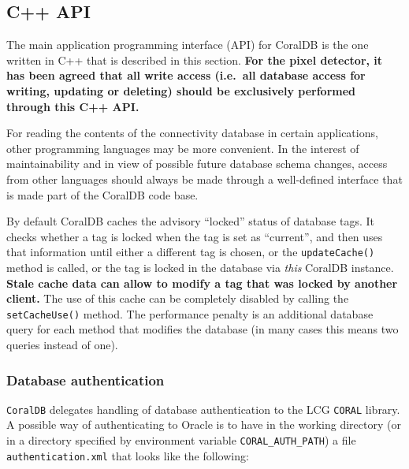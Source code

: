 
\begingroup
\newcommand{\code}[1]{\texttt{#1}}
\newcommand{\args}[1]{\textsl{#1}}


\subsection{C++ API}


The main application programming interface (API) for CoralDB is the one written in C++ that is described in this section.
{\bf For the pixel detector, it has been agreed that all write access (i.e.\ all
database access for writing, updating or deleting)
should be exclusively performed through this C++ API. }

For reading the contents of the
connectivity database in certain applications, other programming languages may be more convenient.
In the interest of maintainability and in view of possible future database schema changes, access from
other languages should always be made through a well-defined interface that is made part of the CoralDB
code base.

By default CoralDB caches the advisory ``locked'' status of database
tags.  It checks whether a tag is locked when the tag is set as
``current'', and then uses that information until either a different
tag is chosen, or the \code{updateCache()} method is called, or the
tag is locked in the database via \emph{this} CoralDB instance.
\textbf{Stale cache data can allow to modify a tag that was locked by
  another client.}  The use of this cache can be completely disabled by
calling the \code{setCacheUse()} method.  The performance penalty is
an additional database query for each method that modifies the
database (in many cases this means two queries instead of one).

\subsubsection{Database authentication}

\code{CoralDB} delegates handling of database authentication to the
LCG \code{CORAL} library.   A possible way of authenticating to 
Oracle is to have in the working directory (or in a directory
specified by environment variable \code{CORAL\_AUTH\_PATH})
a file \code{authentication.xml} that looks like the following:

